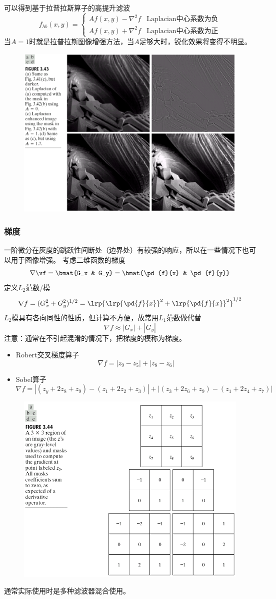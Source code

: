 可以得到基于拉普拉斯算子的高提升滤波
\[f_{hb}(x,y)=
\begin{cases}
Af(x,y)-\nabla^2 f & \text{Laplacian中心系数为负}\\
Af(x,y)+\nabla^2 f & \text{Laplacian中心系数为正}
\end{cases}\]
当$A=1$时就是拉普拉斯图像增强方法，当$A$足够大时，锐化效果将变得不明显。
\begin{figure}[H]
\centering
\includegraphics[width=0.6\linewidth]{fig/high-boost.png}
\end{figure}

\subsubsection{梯度}
一阶微分在灰度的跳跃性间断处（边界处）有较强的响应，所以在一些情况下也可以用于图像增强。
考虑二维函数的梯度
\[\nabla\vf=\bmat{G_x & G_y}=\bmat{\pd{f}{x} & \pd{f}{y}}\]
定义$L_2$范数/模
\[\nabla f=(G_x^2+G_y^2)^{1/2}=\lrp{\lrp{\pd{f}{x}}^2+\lrp{\pd{f}{x}}^2}^{1/2}\]
$L_2$模具有各向同性的性质，但计算不方便，故常用$L_1$范数做代替
\[\nabla f\approx |G_x|+|G_y|\]
注意：通常在不引起混淆的情况下，把梯度的模称为梯度。
\begin{itemize}
\item Robert交叉梯度算子
\[\nabla f=|z_9-z_5|+|z_8-z_6|\]
\item Sobel算子
\[\nabla f=|(z_y+2z_8+z_9)-(z_1+2z_2+z_3)|+|(z_3+2z_6+z_9)-(z_1+2z_4+z_7)|\]
\end{itemize}
\begin{figure}[H]
\centering
\includegraphics[width=0.6\linewidth]{fig/sobel_and_robert.png}
\end{figure}

通常实际使用时是多种滤波器混合使用。